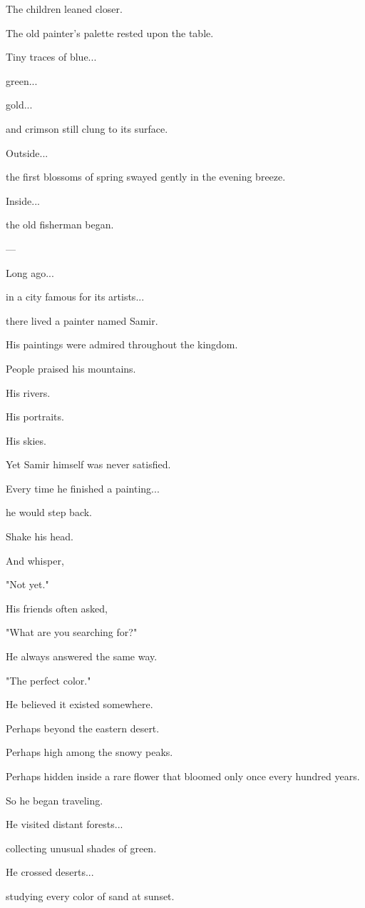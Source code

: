 \documentclass[12pt,openany]{book}
\begin{document}
The children leaned closer.

The old painter's palette rested upon the table.

Tiny traces of blue...

green...

gold...

and crimson still clung to its surface.

Outside...

the first blossoms of spring swayed gently in the evening breeze.

Inside...

the old fisherman began.

---

Long ago...

in a city famous for its artists...

there lived a painter named Samir.

His paintings were admired throughout the kingdom.

People praised his mountains.

His rivers.

His portraits.

His skies.

Yet Samir himself was never satisfied.

Every time he finished a painting...

he would step back.

Shake his head.

And whisper,

"Not yet."

His friends often asked,

"What are you searching for?"

He always answered the same way.

"The perfect color."

He believed it existed somewhere.

Perhaps beyond the eastern desert.

Perhaps high among the snowy peaks.

Perhaps hidden inside a rare flower that bloomed only once every hundred years.

So he began traveling.

He visited distant forests...

collecting unusual shades of green.

He crossed deserts...

studying every color of sand at sunset.
\end{document}
